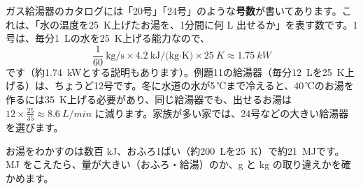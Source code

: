 \begin{phkougaku}[給湯器の「号数」]
ガス給湯器のカタログには「20号」「24号」のような\textbf{号数}が書いてあります。これは、「水の温度を\qty{25}{K}上げたお湯を、1分間に何 L 出せるか」を表す数です。1号は、毎分\qty{1}{L}の水を\qty{25}{K}上げる能力なので、
\[\frac{1}{60}\ \text{kg/s}\times4.2\ \text{kJ/(kg·K)}\times\qty{25}{K}\approx\qty{1.75}{kW}\]
です（約\qty{1.74}{kW}とする説明もあります）。例題11の給湯器（毎分\qty{12}{L}を\qty{25}{K}上げる）は、ちょうど12号です。冬に水道の水が5\,℃まで冷えると、40\,℃のお湯を作るには\qty{35}{K}上げる必要があり、同じ給湯器でも、出せるお湯は $12\times\tfrac{25}{35}\approx\qty{8.6}{L/min}$ に減ります。家族が多い家では、24号などの大きい給湯器を選びます。

\begin{phketa}[熱の量の目安]
お湯をわかすのは数百 kJ、おふろ1ぱい（約\qty{200}{L}を\qty{25}{K}）で約\qty{21}{MJ}です。MJ をこえたら、量が大きい（おふろ・給湯）のか、g と kg の取り違えかを確かめます。
\end{phketa}
\end{phkougaku}



